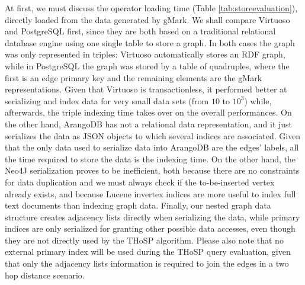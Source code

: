 At first, we must discuss the operator loading time (Table \ref{tab:storeevaluation}), directly loaded from the data generated by gMark. We shall  compare Virtuoso and PostgreSQL first, since they are both based on a traditional relational database engine using one single table to store a graph. In both cases the graph was only represented in triples: Virtuoso automatically stores an RDF graph, while in PostgreSQL the graph was stored by a table of quadruples, where the first is an edge primary key and the remaining elements are the gMark representations. Given that Virtuoso is transactionless, it performed better at serializing and index data for very small data sets (from $10$ to $10^3$) while, afterwards, the triple indexing time takes over on the overall performances. On the other hand, ArangoDB has not a relational data representation, and it just serializes the data as JSON objects to which several indices are associated. Given that the only data used to serialize data into ArangoDB are the edges' labels, all the time required to store the data is the indexing time. On the other hand, the Neo4J serialization proves to be inefficient, both because there are no constraints for data duplication and we must always check if the to-be-inserted vertex already exists, and because Lucene invertex indices are more useful to index full text documents than indexing graph data. Finally, our nested graph data structure creates adjacency lists directly when serializing the data, while primary indices are only serialized for granting other possible data accesses, even though they are not directly used by the THoSP algorithm. Please also note that no external primary index will be used during the THoSP query evaluation, given that only the adjacency lists information is required to join the edges in a two hop distance scenario.


